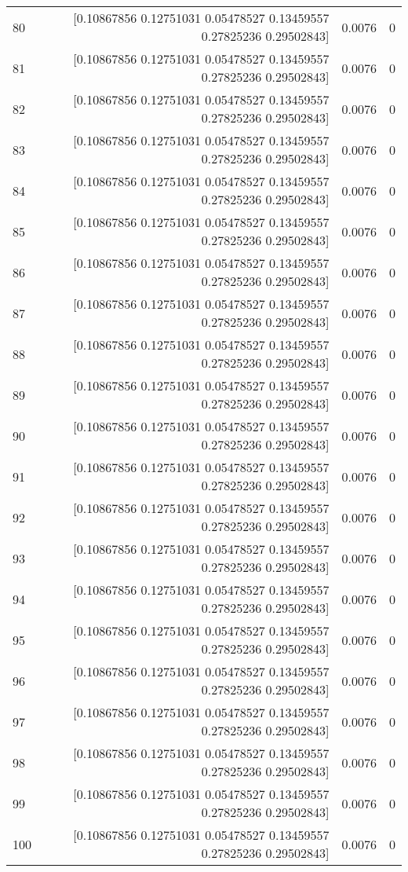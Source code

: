 \begin{longtable}{lrrr}
80 & [0.10867856 0.12751031 0.05478527 0.13459557 0.27825236 0.29502843] & 0.0076 & 0 \\
81 & [0.10867856 0.12751031 0.05478527 0.13459557 0.27825236 0.29502843] & 0.0076 & 0 \\
82 & [0.10867856 0.12751031 0.05478527 0.13459557 0.27825236 0.29502843] & 0.0076 & 0 \\
83 & [0.10867856 0.12751031 0.05478527 0.13459557 0.27825236 0.29502843] & 0.0076 & 0 \\
84 & [0.10867856 0.12751031 0.05478527 0.13459557 0.27825236 0.29502843] & 0.0076 & 0 \\
85 & [0.10867856 0.12751031 0.05478527 0.13459557 0.27825236 0.29502843] & 0.0076 & 0 \\
86 & [0.10867856 0.12751031 0.05478527 0.13459557 0.27825236 0.29502843] & 0.0076 & 0 \\
87 & [0.10867856 0.12751031 0.05478527 0.13459557 0.27825236 0.29502843] & 0.0076 & 0 \\
88 & [0.10867856 0.12751031 0.05478527 0.13459557 0.27825236 0.29502843] & 0.0076 & 0 \\
89 & [0.10867856 0.12751031 0.05478527 0.13459557 0.27825236 0.29502843] & 0.0076 & 0 \\
90 & [0.10867856 0.12751031 0.05478527 0.13459557 0.27825236 0.29502843] & 0.0076 & 0 \\
91 & [0.10867856 0.12751031 0.05478527 0.13459557 0.27825236 0.29502843] & 0.0076 & 0 \\
92 & [0.10867856 0.12751031 0.05478527 0.13459557 0.27825236 0.29502843] & 0.0076 & 0 \\
93 & [0.10867856 0.12751031 0.05478527 0.13459557 0.27825236 0.29502843] & 0.0076 & 0 \\
94 & [0.10867856 0.12751031 0.05478527 0.13459557 0.27825236 0.29502843] & 0.0076 & 0 \\
95 & [0.10867856 0.12751031 0.05478527 0.13459557 0.27825236 0.29502843] & 0.0076 & 0 \\
96 & [0.10867856 0.12751031 0.05478527 0.13459557 0.27825236 0.29502843] & 0.0076 & 0 \\
97 & [0.10867856 0.12751031 0.05478527 0.13459557 0.27825236 0.29502843] & 0.0076 & 0 \\
98 & [0.10867856 0.12751031 0.05478527 0.13459557 0.27825236 0.29502843] & 0.0076 & 0 \\
99 & [0.10867856 0.12751031 0.05478527 0.13459557 0.27825236 0.29502843] & 0.0076 & 0 \\
100 & [0.10867856 0.12751031 0.05478527 0.13459557 0.27825236 0.29502843] & 0.0076 & 0 \\

\end{longtable}
